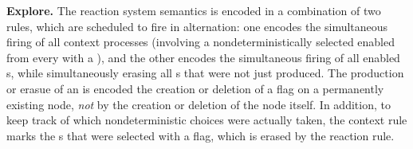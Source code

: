 \medskip\noindent\textbf{Explore.}
%
The reaction system semantics is encoded in a combination of two rules, which are scheduled to fire in alternation: one encodes the simultaneous firing of all context processes (involving a nondeterministically selected enabled \Step from every \State with a \Token), and the other encodes the simultaneous firing of all enabled \Reaction{}s, while simultaneously erasing all \Entity{}s that were not just produced. The production or erasue of an \Entity is encoded the creation or deletion of a \present flag on a permanently existing \Entity node, \emph{not} by the creation or deletion of the node itself. In addition, to keep track of which nondeterministic choices were actually taken, the context rule marks the \Step{}s that were selected with a \fired flag, which is erased by the reaction rule.

